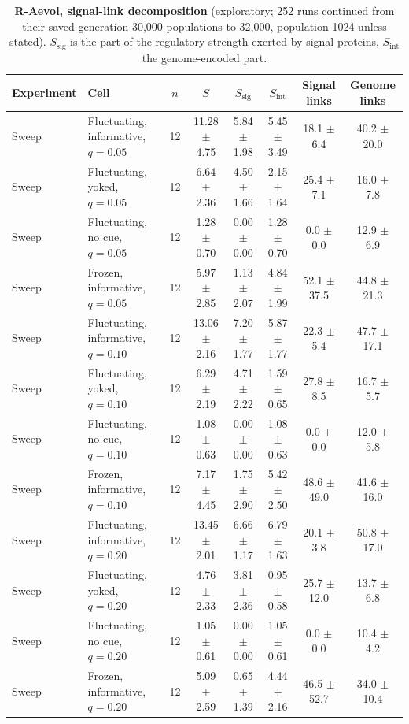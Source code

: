 \begin{table}[!ht]\small
\caption{\textbf{R-Aevol, signal-link decomposition} (exploratory; 252 runs continued from their saved generation-30{,}000 populations to 32{,}000, population 1024 unless stated). $S_\mathrm{sig}$ is the part of the regulatory strength exerted by signal proteins, $S_\mathrm{int}$ the genome-encoded part.}
\begin{tabular}{@{}llcccccc@{}}\toprule
Experiment & Cell & $n$ & $S$ & $S_\mathrm{sig}$ & $S_\mathrm{int}$ & Signal links & Genome links\\\midrule
Sweep & Fluctuating, informative, $q=0.05$ & 12 & 11.28 $\pm$ 4.75 & 5.84 $\pm$ 1.98 & 5.45 $\pm$ 3.49 & 18.1 $\pm$ 6.4 & 40.2 $\pm$ 20.0\\
Sweep & Fluctuating, yoked, $q=0.05$ & 12 & 6.64 $\pm$ 2.36 & 4.50 $\pm$ 1.66 & 2.15 $\pm$ 1.64 & 25.4 $\pm$ 7.1 & 16.0 $\pm$ 7.8\\
Sweep & Fluctuating, no cue, $q=0.05$ & 12 & 1.28 $\pm$ 0.70 & 0.00 $\pm$ 0.00 & 1.28 $\pm$ 0.70 & 0.0 $\pm$ 0.0 & 12.9 $\pm$ 6.9\\
Sweep & Frozen, informative, $q=0.05$ & 12 & 5.97 $\pm$ 2.85 & 1.13 $\pm$ 2.07 & 4.84 $\pm$ 1.99 & 52.1 $\pm$ 37.5 & 44.8 $\pm$ 21.3\\
Sweep & Fluctuating, informative, $q=0.10$ & 12 & 13.06 $\pm$ 2.16 & 7.20 $\pm$ 1.77 & 5.87 $\pm$ 1.77 & 22.3 $\pm$ 5.4 & 47.7 $\pm$ 17.1\\
Sweep & Fluctuating, yoked, $q=0.10$ & 12 & 6.29 $\pm$ 2.19 & 4.71 $\pm$ 2.22 & 1.59 $\pm$ 0.65 & 27.8 $\pm$ 8.5 & 16.7 $\pm$ 5.7\\
Sweep & Fluctuating, no cue, $q=0.10$ & 12 & 1.08 $\pm$ 0.63 & 0.00 $\pm$ 0.00 & 1.08 $\pm$ 0.63 & 0.0 $\pm$ 0.0 & 12.0 $\pm$ 5.8\\
Sweep & Frozen, informative, $q=0.10$ & 12 & 7.17 $\pm$ 4.45 & 1.75 $\pm$ 2.90 & 5.42 $\pm$ 2.50 & 48.6 $\pm$ 49.0 & 41.6 $\pm$ 16.0\\
Sweep & Fluctuating, informative, $q=0.20$ & 12 & 13.45 $\pm$ 2.01 & 6.66 $\pm$ 1.17 & 6.79 $\pm$ 1.63 & 20.1 $\pm$ 3.8 & 50.8 $\pm$ 17.0\\
Sweep & Fluctuating, yoked, $q=0.20$ & 12 & 4.76 $\pm$ 2.33 & 3.81 $\pm$ 2.36 & 0.95 $\pm$ 0.58 & 25.7 $\pm$ 12.0 & 13.7 $\pm$ 6.8\\
Sweep & Fluctuating, no cue, $q=0.20$ & 12 & 1.05 $\pm$ 0.61 & 0.00 $\pm$ 0.00 & 1.05 $\pm$ 0.61 & 0.0 $\pm$ 0.0 & 10.4 $\pm$ 4.2\\
Sweep & Frozen, informative, $q=0.20$ & 12 & 5.09 $\pm$ 2.59 & 0.65 $\pm$ 1.39 & 4.44 $\pm$ 2.16 & 46.5 $\pm$ 52.7 & 34.0 $\pm$ 10.4\\

\end{tabular}
\end{table}
